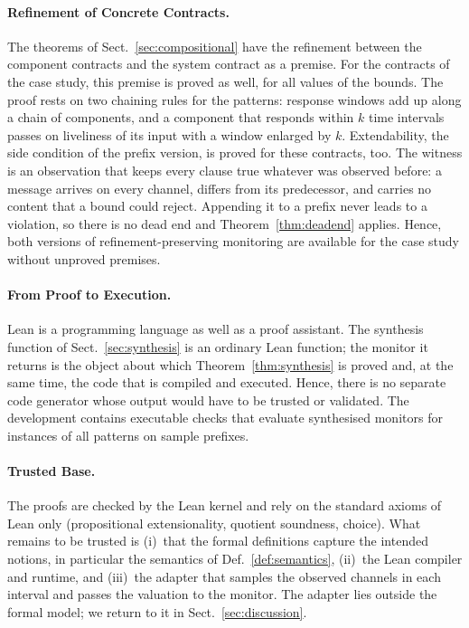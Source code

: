 \paragraph{Refinement of Concrete Contracts.}
The theorems of Sect.~\ref{sec:compositional} have the refinement between the component contracts and the system contract as a premise. For the contracts of the case study, this premise is proved as well, for all values of the bounds. The proof rests on two chaining rules for the patterns: response windows add up along a chain of components, and a component that responds within $k$ time intervals passes on liveliness of its input with a window enlarged by $k$. Extendability, the side condition of the prefix version, is proved for these contracts, too. The witness is an observation that keeps every clause true whatever was observed before: a message arrives on every channel, differs from its predecessor, and carries no content that a bound could reject. Appending it to a prefix never leads to a violation, so there is no dead end and Theorem~\ref{thm:deadend} applies. Hence, both versions of refinement-preserving monitoring are available for the case study without unproved premises.

\paragraph{From Proof to Execution.}
Lean is a programming language as well as a proof assistant. The synthesis function of Sect.~\ref{sec:synthesis} is an ordinary Lean function; the monitor it returns is the object about which Theorem~\ref{thm:synthesis} is proved and, at the same time, the code that is compiled and executed. Hence, there is no separate code generator whose output would have to be trusted or validated. The development contains executable checks that evaluate synthesised monitors for instances of all patterns on sample prefixes.

\paragraph{Trusted Base.}
The proofs are checked by the Lean kernel and rely on the standard axioms of Lean only (propositional extensionality, quotient soundness, choice). What remains to be trusted is (i)~that the formal definitions capture the intended notions, in particular the semantics of Def.~\ref{def:semantics}, (ii)~the Lean compiler and runtime, and (iii)~the adapter that samples the observed channels in each interval and passes the valuation to the monitor. The adapter lies outside the formal model; we return to it in Sect.~\ref{sec:discussion}.

